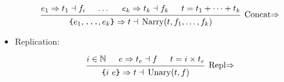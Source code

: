 \documentclass{article}
\DeclareMathOperator{\Unary}{Unary}
\DeclareMathOperator{\Narry}{Narry}
\renewcommand{\S}{\ensuremath{\Rightarrow}}
\newcommand{\s}[3]{#1 \S{} #2 \dashv{} #3}
\begin{document}
\begin{itemize}[leftmargin=*]
          \begin{equation*}
              \begin{prooftree}
                  \hypo{\s{e_1}{t_1}{f_i}}
                  \hypo{\dots}
                  \hypo{\s{e_k}{t_k}{f_k}}
                  \hypo{t = t_1 + \cdots + t_k}
                  \infer4[Concat\S]{\s{\texttt{\{}e_1, \texttt{\dots}, e_k \texttt{\}}}{t}
                      {\Narry(t, f_1, \dots, f_k)}}
              \end{prooftree}
          \end{equation*}


    \item Replication:

          \begin{equation*}
              \begin{prooftree}
                  \hypo{i \in \mathbb{N}}
                  \hypo{\s{e}{t_e}{f}}
                  \hypo{t = i \times t_e}
                  \infer3[Repl\S]{\s{\texttt{\{}i~e\texttt{\}}}{t}{\Unary(t, f)}}
              \end{prooftree}
          \end{equation*}
\end{itemize}
\end{document}
